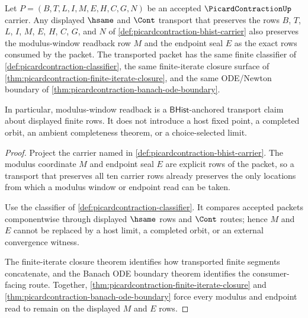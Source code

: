 \begin{theorem}
\label{thm:picardcontraction-modulus-window-transport}
Let $P=(B,T,L,I,M,E,H,C,G,N)$ be an accepted $\PicardContractionUp$ carrier. Any displayed $\hsame$ and $\Cont$ transport that preserves the rows $B$, $T$, $L$, $I$, $M$, $E$, $H$, $C$, $G$, and $N$ of \autoref{def:picardcontraction-bhist-carrier} also preserves the modulus-window readback row $M$ and the endpoint seal $E$ as the exact rows consumed by the packet. The transported packet has the same finite classifier of \autoref{def:picardcontraction-classifier}, the same finite-iterate closure surface of \autoref{thm:picardcontraction-finite-iterate-closure}, and the same ODE/Newton boundary of \autoref{thm:picardcontraction-banach-ode-boundary}.

In particular, modulus-window readback is a $\mathsf{BHist}$-anchored transport claim about displayed finite rows. It does not introduce a host fixed point, a completed orbit, an ambient completeness theorem, or a choice-selected limit.
\end{theorem}
\begin{proof}
Project the carrier named in \autoref{def:picardcontraction-bhist-carrier}. The modulus coordinate $M$ and endpoint seal $E$ are explicit rows of the packet, so a transport that preserves all ten carrier rows already preserves the only locations from which a modulus window or endpoint read can be taken.

Use the classifier of \autoref{def:picardcontraction-classifier}. It compares accepted packets componentwise through displayed $\hsame$ rows and $\Cont$ routes; hence $M$ and $E$ cannot be replaced by a host limit, a completed orbit, or an external convergence witness.

The finite-iterate closure theorem identifies how transported finite segments concatenate, and the Banach ODE boundary theorem identifies the consumer-facing route. Together, \autoref{thm:picardcontraction-finite-iterate-closure} and \autoref{thm:picardcontraction-banach-ode-boundary} force every modulus and endpoint read to remain on the displayed $M$ and $E$ rows.
\end{proof}

